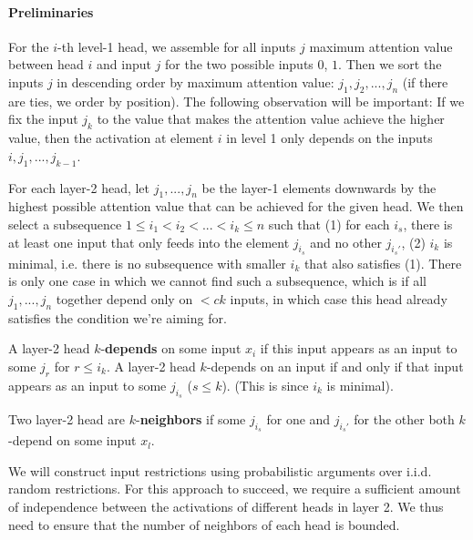 \documentclass[11pt,a4paper]{article}
\begin{document}
\paragraph{Preliminaries}
For the $i$-th level-1 head, we assemble for all inputs $j$ maximum attention value between head $i$ and input $j$ for the two possible inputs $0$, $1$.
Then we sort the inputs $j$ in descending order by maximum attention value: $j_1, j_2, ..., j_n$ (if there are ties, we order by position).
The following observation will be important: If we fix the input $j_k$ to the value that makes the attention value achieve the higher value, then the activation at element $i$ in level 1 only depends on the inputs $i, j_1, ..., j_{k-1}$.


For each layer-2 head, let $j_1, ..., j_n$ be the layer-1 elements downwards by the highest possible attention value that can be achieved for the given head.
We then select a subsequence $1 \leq i_1 < i_2 < ... < i_k \leq n$ such that (1) for each $i_s$, there is at least one input that only feeds into the element $j_{i_s}$ and no other $j_{i_s'}$, (2) $i_k$ is minimal, i.e. there is no subsequence with smaller $i_k$ that also satisfies (1).
There is only one case in which we cannot find such a subsequence, which is if all $j_1, ..., j_n$ together depend only on $< ck$ inputs, in which case this head already satisfies the condition we're aiming for.

A layer-2 head $k$-\textbf{depends} on some input $x_i$ if this input appears as an input to some $j_r$ for $r \leq i_k$.
A layer-2 head $k$-depends on an input if and only if that input appears as an input to some $j_{i_s}$ ($s \leq k$). (This is since $i_k$ is minimal).

Two layer-2 head are $k$-\textbf{neighbors} if some $j_{i_s}$ for one and $j_{i_s'}$ for the other both $k$-depend on some input $x_l$.



We will construct input restrictions using probabilistic arguments over i.i.d. random restrictions.
For this approach to succeed, we require a  sufficient amount of independence between the activations of different heads in layer 2.
We thus need to ensure that the number of neighbors of each head is bounded.
\end{document}
